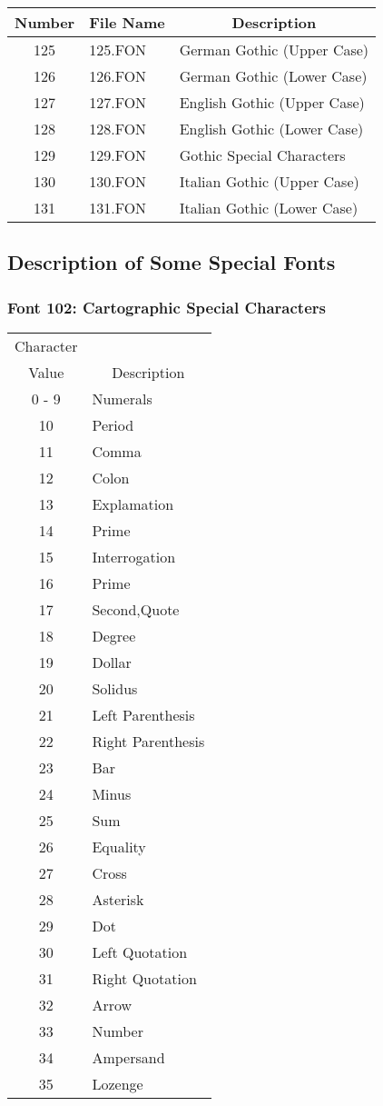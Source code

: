 \begin{tabular}{|c|l|l|}
\hline
\multicolumn{1}{|c|}{Number}
&\multicolumn{1}{|c|}{File Name}
&\multicolumn{1}{|c|}{Description}\\ \hline
125 & 125.FON & German Gothic (Upper Case)\\
126 & 126.FON & German Gothic (Lower Case)\\
127 & 127.FON & English Gothic (Upper Case)\\
128 & 128.FON & English Gothic (Lower Case)\\
129 & 129.FON & Gothic Special Characters\\
130 & 130.FON & Italian Gothic (Upper Case)\\
131 & 131.FON & Italian Gothic (Lower Case)\\ \hline
\end{tabular}
\newpage
\subsection{Description of Some Special Fonts}
\subsubsection{Font 102: Cartographic Special Characters}
\begin{tabular}{|c|l|}
\hline
\multicolumn{1}{|c|}{Character}&\\
\multicolumn{1}{|c|}{Value}
&\multicolumn{1}{|c|}{Description}\\
\hline
0 - 9 & Numerals\\
10 & Period\\
11 & Comma\\
12 & Colon\\
13 & Explamation\\
14 & Prime\\
15 & Interrogation\\
16 & Prime\\
17 & Second,Quote\\
18 & Degree\\
19 & Dollar\\
20 & Solidus\\
21 & Left Parenthesis\\
22 & Right Parenthesis\\
23 & Bar\\
24 & Minus\\
25 & Sum\\
26 & Equality\\
27 & Cross\\
28 & Asterisk\\
29 & Dot\\
30 & Left Quotation\\
31 & Right Quotation\\
32 & Arrow\\
33 & Number\\
34 & Ampersand\\
35 & Lozenge\\ \hline
\end{tabular}
\newpage
